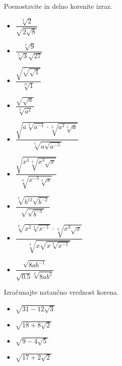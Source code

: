         
            \begin{naloga}
                Poenostavite in delno korenite izraz.
                \begin{multicols}{2}
                    \begin{itemize}
                        \item $\displaystyle \dfrac{\sqrt[4]{2}}{\sqrt{2\sqrt{8}}}$ 
                        \item $\displaystyle \dfrac{\sqrt[3]{9}}{\sqrt[5]{3}\sqrt{27}}$ 
                        \item $\displaystyle \dfrac{\sqrt{\sqrt{\sqrt{1}}}}{\sqrt[17]{1}}$ 
                        \item $\displaystyle \dfrac{\sqrt{\sqrt{a}}}{\sqrt[3]{a^2}}$ 
                        \item $\displaystyle \dfrac{\sqrt{a\sqrt[3]{a^{-1}}\cdot\sqrt[3]{a^2\sqrt[5]{a}}}}{\sqrt[5]{a\sqrt{a^{-5}}}}$ 
                        \item $\displaystyle \dfrac{\sqrt{x^3\sqrt[4]{x^3\sqrt{x}}}}{\sqrt[4]{x^{-3}\sqrt[4]{x}}}$ 
                        \item $\displaystyle \dfrac{\sqrt[7]{b^{13}\sqrt{b^{-2}}}}{\sqrt{\sqrt{b^{-1}}}}$ 
                        \item $\displaystyle \dfrac{\sqrt[3]{x^2\sqrt[4]{x^{-1}}}\cdot\sqrt[4]{x^3\sqrt{x}}}{\sqrt[4]{x\sqrt{x\sqrt[3]{x^{-1}}}}}$ 
                        \item $\displaystyle \dfrac{\sqrt{8ab^{-1}}}{\sqrt{0.5}\sqrt[3]{8ab^2}}$ 
                    \end{itemize}
                \end{multicols}
            \end{naloga}
        
        
            \begin{naloga}
                Izračunajte natančno vrednost korena.
                \begin{multicols}{2}
                    \begin{itemize}
                        \item $\displaystyle \sqrt{31-12\sqrt{3}}$ 
                        \item $\displaystyle \sqrt{18+8\sqrt{2}}$ 
                        \item $\displaystyle \sqrt{9-4\sqrt{5}}$ 
                        \item $\displaystyle \sqrt{17+2\sqrt{2}}$ 
                    \end{itemize}
                \end{multicols}
            \end{naloga}
        
